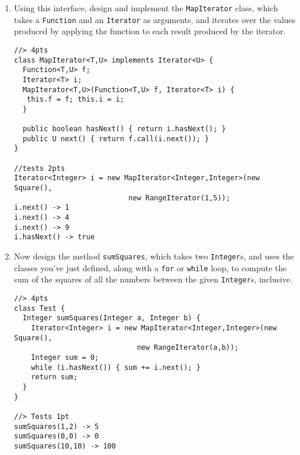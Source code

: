 \documentclass[12pt]{article}                   %
\newenvironment{solution}{\color{red}}{}
\begin{document}
\begin{problem}
\begin{enumerate}
\item Using this interface, design and implement the {\tt MapIterator}
class, which takes a \verb|Function| and an \verb|Iterator| as
arguments, and iterates over the values produced by applying the
function to each result produced by the iterator.

\ifrubric
\begin{solution}
\begin{verbatim}
//> 4pts
class MapIterator<T,U> implements Iterator<U> {
  Function<T,U> f;
  Iterator<T> i;
  MapIterator<T,U>(Function<T,U> f, Iterator<T> i) {
   this.f = f; this.i = i;
  }

  public boolean hasNext() { return i.hasNext(); }
  public U next() { return f.call(i.next()); }
}

//tests 2pts
Iterator<Integer> i = new MapIterator<Integer,Integer>(new Square(), 
                           new RangeIterator(1,5));
i.next() -> 1
i.next() -> 4
i.next() -> 9
i.hasNext() -> true

\end{verbatim}
\end{solution}
\else
\fi
\newpage

\noindent
\item Now design the method \verb|sumSquares|, which takes two
\verb|Integer|s, and uses the classes you've just defined, along with
a \verb|for| or \verb|while| loop, to compute the sum of the squares
of all the numbers between the given \verb|Integer|s, inclusive.

\ifrubric
\begin{solution}
\begin{verbatim}
//> 4pts
class Test {
  Integer sumSquares(Integer a, Integer b) {
    Iterator<Integer> i = new MapIterator<Integer,Integer>(new Square(), 
                             new RangeIterator(a,b));
    Integer sum = 0;
    while (i.hasNext()) { sum += i.next(); }
    return sum;
  }
}

//> Tests 1pt
sumSquares(1,2) -> 5
sumSquares(0,0) -> 0
sumSquares(10,10) -> 100
\end{verbatim}
\end{solution}
\else
{}
\fi
\end{enumerate}
\end{problem}
\end{document}
